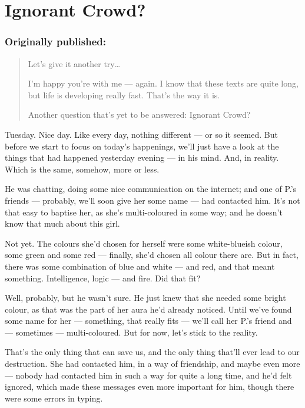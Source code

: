 \chapter{Ignorant Crowd?}
\label{cha:ignorant-crowd}
\subsection*{Originally published: }
\begin{quote}
Let's give it another try\dots{}

I'm happy you're with me --- again. I know that these texts are quite long, but life is developing really fast. 
That's the way it is.

Another question that's yet to be answered: Ignorant Crowd?
\end{quote}

Tuesday. 
Nice day. 
Like every day, nothing different --- or so it seemed. 
But before we start to focus on today's happenings, we'll just have a look at the things that had happened yesterday evening --- in his mind. 
And, in reality. 
Which is the same, somehow, more or less.

He was chatting, doing some nice communication on the internet; and one of P.'s friends --- probably, we'll soon give her some name --- had contacted him. 
It's not that easy to baptise her, as she's multi-coloured in some way; and he doesn't know that much about this girl.

Not yet. 
The colours she'd chosen for herself were some white-blueish colour, some green and some red --- finally, she'd chosen all colour there are. 
But in fact, there was some combination of blue and white --- and red, and that meant something. 
Intelligence, logic --- and fire. 
Did that fit?

Well, probably, but he wasn't sure. 
He just knew that she needed some bright colour, as that was the part of her aura he'd already noticed. 
Until we've found some name for her --- something, that really fits --- we'll call her P.'s friend and --- sometimes --- multi-coloured. 
But for now, let's stick to the reality.

That's the only thing that can save us, and the only thing that'll ever lead to our destruction. 
She had contacted him, in a way of friendship, and maybe even more --- nobody had contacted him in such a way for quite a long time, and he'd felt ignored, which made these messages even more important for him, though there were some errors in typing.

